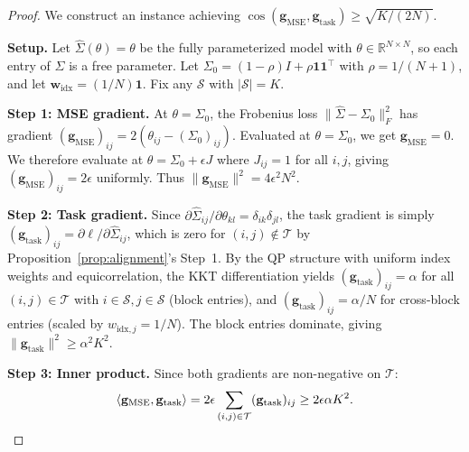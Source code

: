\documentclass[letterpaper]{article}
\newcommand{\bw}{\mathbf{w}}
\newcommand{\cS}{\mathcal{S}}
\begin{document}
\begin{proof}
We construct an instance achieving $\cos(\mathbf{g}_{\mathrm{MSE}}, \mathbf{g}_{\mathrm{task}}) \geq \sqrt{K/(2N)}$.

\textbf{Setup.} Let $\hat\Sigma(\theta) = \theta$ be the fully parameterized model with $\theta \in \mathbb{R}^{N \times N}$, so each entry of $\hat\Sigma$ is a free parameter. Let $\Sigma_0 = (1-\rho)I + \rho \mathbf{1}\mathbf{1}^\top$ with $\rho = 1/(N+1)$, and let $\bw_{\mathrm{idx}} = (1/N)\mathbf{1}$. Fix any $\cS$ with $|\cS| = K$.

\textbf{Step 1: MSE gradient.} At $\theta = \Sigma_0$, the Frobenius loss $\|\hat\Sigma - \Sigma_0\|_F^2$ has gradient $(\mathbf{g}_{\mathrm{MSE}})_{ij} = 2(\theta_{ij} - (\Sigma_0)_{ij})$. Evaluated at $\theta = \Sigma_0$, we get $\mathbf{g}_{\mathrm{MSE}} = 0$. We therefore evaluate at $\theta = \Sigma_0 + \epsilon J$ where $J_{ij} = 1$ for all $i,j$, giving $(\mathbf{g}_{\mathrm{MSE}})_{ij} = 2\epsilon$ uniformly. Thus $\|\mathbf{g}_{\mathrm{MSE}}\|^2 = 4\epsilon^2 N^2$.

\textbf{Step 2: Task gradient.} Since $\partial\hat\Sigma_{ij}/\partial\theta_{kl} = \delta_{ik}\delta_{jl}$, the task gradient is simply $(\mathbf{g}_{\mathrm{task}})_{ij} = \partial\ell/\partial\hat\Sigma_{ij}$, which is zero for $(i,j) \notin \mathcal{T}$ by Proposition~\ref{prop:alignment}'s Step~1. By the QP structure with uniform index weights and equicorrelation, the KKT differentiation yields $(\mathbf{g}_{\mathrm{task}})_{ij} = \alpha$ for all $(i,j) \in \mathcal{T}$ with $i \in \cS, j \in \cS$ (block entries), and $(\mathbf{g}_{\mathrm{task}})_{ij} = \alpha/N$ for cross-block entries (scaled by $w_{\mathrm{idx},j} = 1/N$). The block entries dominate, giving $\|\mathbf{g}_{\mathrm{task}}\|^2 \geq \alpha^2 K^2$.

\textbf{Step 3: Inner product.} Since both gradients are non-negative on $\mathcal{T}$:
\begin{equation}
\langle \mathbf{g}_{\mathrm{MSE}}, \mathbf{g}_{\mathrm{task}} \rangle = 2\epsilon \sum_{(i,j) \in \mathcal{T}} (\mathbf{g}_{\mathrm{task}})_{ij} \geq 2\epsilon \alpha K^2. \notag
\end{equation}


\end{proof}
\end{document}
